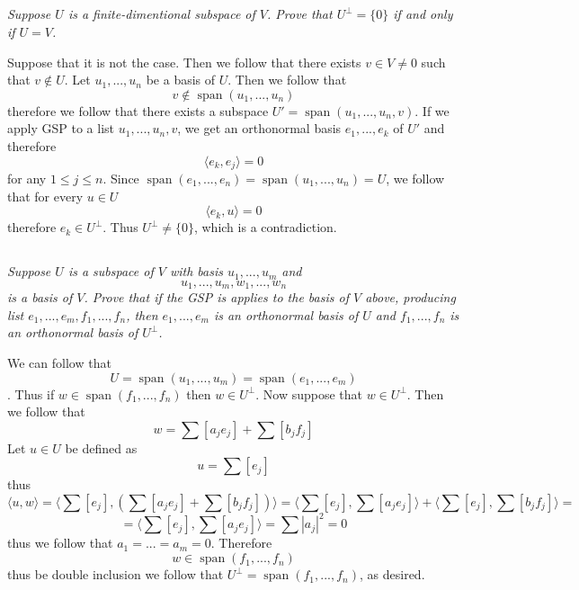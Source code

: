 \documentclass[11pt,oneside,titlepage]{book}
\DeclareMathOperator \Span {span}
\newcommand{\eangle}[1]{\langle #1 \rangle}
\begin{document}
\subsection{}

\textit{Suppose $U$ is a finite-dimentional subspace of $V$. Prove that $U^\perp = \{0\}$ if and
  only if $U = V$.}

Suppose that it is not the case. Then we follow that there exists $v \in V \neq 0$ such that
$v \notin U$. Let $u_1, ..., u_n$ be a basis of $U$. Then we follow that
$$v \notin \Span(u_1, ..., u_n)$$
therefore we follow that there exists a subspace $U' = \Span(u_1, ..., u_n, v)$. If we apply
GSP to a list $u_1, ..., u_n, v$, we get an orthonormal basis $e_1, ..., e_k$ of $U'$ and
therefore
$$\eangle{e_k, e_j} = 0$$
for any $1 \leq j \leq n$. Since $\Span(e_1, ..., e_n) = \Span(u_1, ..., u_n) = U$, we follow that
for every $u \in U$
$$\eangle{e_k, u} = 0$$
therefore $e_k \in U^\perp$. Thus $U^\perp \neq \{0\}$, which is a contradiction. 

\subsection{}

\textit{Suppose $U$ is a subspace of $V$ with basis $u_1, ..., u_m$ and
$$u_1, ..., u_m, w_1, ..., w_n$$
is a basis of $V$. Prove that if the GSP is applies to the basis of $V$ above, producing list
$e_1, ..., e_m, f_1, ..., f_n$, then $e_1, ..., e_m$ is an orthonormal basis of $U$ and
$f_1, ..., f_n$ is an orthonormal basis of $U^\perp$.}

We can follow that $$U = \Span(u_1, ..., u_m) = \Span(e_1, ..., e_m)$$. Thus if
$w \in \Span(f_1, ..., f_n)$ then $w \in U^\perp$.
Now suppose that $w \in U^\perp$. Then we follow that
$$w = \sum{[a_j e_j]} + \sum{[b_j f_j]}$$
Let $u \in U$ be defined as 
$$u = \sum{[ e_j]}$$
thus 
$$\eangle{u, w} = \eangle{\sum{[ e_j]}, \left(\sum{[a_j e_j]} + \sum{[b_j f_j]}\right)} =
\eangle{\sum{[ e_j]}, \sum{[a_j e_j]}} +
\eangle{\sum{[ e_j]}, \sum{[b_j f_j]}} = $$
$$ = \eangle{\sum{[ e_j]}, \sum{[a_j e_j]}} = \sum{|a_j|^2} = 0$$
thus we follow that $a_1 =  ... = a_m = 0$. Therefore
$$w \in \Span(f_1, ..., f_n)$$
thus be double inclusion we follow that $U^\perp = \Span(f_1, ..., f_n)$, as desired.

\subsection{}
\end{document}
